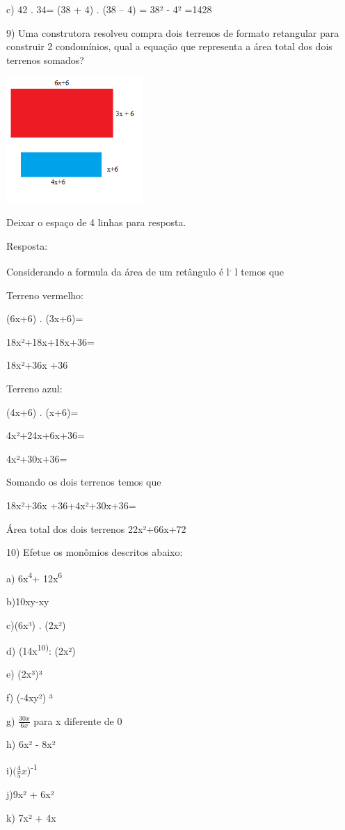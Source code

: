{c) 42 . 34= (38 + 4) . (38 -- 4) = 38² - 4² =1428

9) Uma construtora resolveu compra dois terrenos de formato retangular
para construir 2 condomínios, qual a equação que representa a área total
dos dois terrenos somados?

\includegraphics[width=2.04167in,height=1.8873in]{./imgSAEB_8_MAT/media/image5.png}

Deixar o espaço de 4 linhas para resposta.

Resposta:

Considerando a formula da área de um retângulo é l\textsuperscript{.} l
temos que

Terreno vermelho:

(6x+6) . (3x+6)=

18x²+18x+18x+36=

18x²+36x +36

Terreno azul:

(4x+6) . (x+6)=

4x²+24x+6x+36=

4x²+30x+36=

Somando os dois terrenos temos que

18x²+36x +36+4x²+30x+36=

Área total dos dois terrenos 22x²+66x+72

10) Efetue os monômios descritos abaixo:

a) 6x\textsuperscript{4}+ 12x\textsuperscript{6}

b)10xy-xy

c)(6x³) . (2x²)

d) (14x\textsuperscript{10)}: (2x²)

e) (2x³)³

f) (-4xy²) ³

g) \(\frac{30x}{6x}\) para x diferente de 0

h) 6x² - 8x²

i)\((\frac{4}{5}x\))\textsuperscript{-1}

j)9x² + 6x²

k) 7x² + 4x

}
